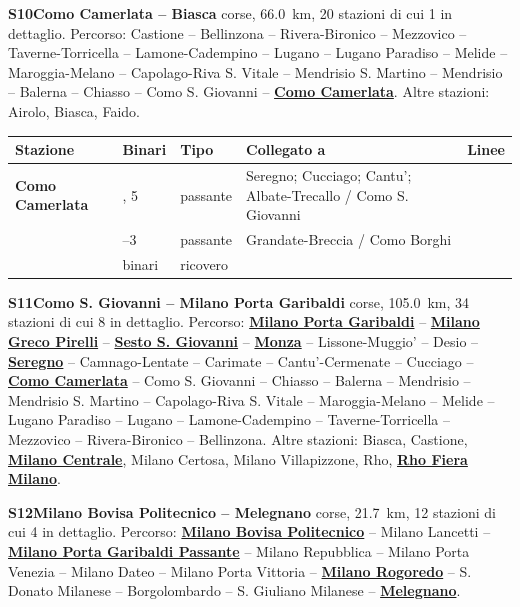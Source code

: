 \medskip\noindent\hypertarget{lin:S10}{\textbf{S10\enspace Como Camerlata -- Biasca}} corse, \SI{66,0}{\km}, 20 stazioni di cui 1 in dettaglio. Percorso: Castione -- Bellinzona -- Rivera-Bironico -- Mezzovico -- Taverne-Torricella -- Lamone-Cadempino -- Lugano -- Lugano Paradiso -- Melide -- Maroggia-Melano -- Capolago-Riva S. Vitale -- Mendrisio S. Martino -- Mendrisio -- Balerna -- Chiasso -- Como S. Giovanni -- \hyperlink{sta:S09998}{\textbf{Como Camerlata}}. Altre stazioni: Airolo, Biasca, Faido.
{\footnotesize\setlength{\LTpre}{2pt}\setlength{\LTpost}{0pt}
\begin{longtable}{@{}>{\raggedright\arraybackslash}p{}>{\raggedright\arraybackslash}p{}>{\raggedright\arraybackslash}p{}>{\raggedright\arraybackslash}p{}>{\raggedright\arraybackslash}p{}@{}}
\toprule
Stazione & Binari & Tipo & Collegato a & Linee \\
\midrule
\endhead
\leavevmode\hypertarget{sta:S09998}{}\textbf{Como Camerlata} & 4, 5 & passante & Seregno; Cucciago; Cantu'; Albate-Trecallo / Como S. Giovanni &  \\
 & 1--3 & passante & Grandate-Breccia / Como Borghi &  \\
 & 2 binari & ricovero & & \\
\bottomrule
\end{longtable}}

\medskip\noindent\hypertarget{lin:S11}{\textbf{S11\enspace Como S. Giovanni -- Milano Porta Garibaldi}} corse, \SI{105,0}{\km}, 34 stazioni di cui 8 in dettaglio. Percorso: \hyperlink{sta:S01645}{\textbf{Milano Porta Garibaldi}} -- \hyperlink{sta:S01326}{\textbf{Milano Greco Pirelli}} -- \hyperlink{sta:S01325}{\textbf{Sesto S. Giovanni}} -- \hyperlink{sta:S01322}{\textbf{Monza}} -- Lissone-Muggio' -- Desio -- \hyperlink{sta:S01318}{\textbf{Seregno}} -- Camnago-Lentate -- Carimate -- Cantu'-Cermenate -- Cucciago -- \hyperlink{sta:S09998}{\textbf{Como Camerlata}} -- Como S. Giovanni -- Chiasso -- Balerna -- Mendrisio -- Mendrisio S. Martino -- Capolago-Riva S. Vitale -- Maroggia-Melano -- Melide -- Lugano Paradiso -- Lugano -- Lamone-Cadempino -- Taverne-Torricella -- Mezzovico -- Rivera-Bironico -- Bellinzona. Altre stazioni: Biasca, Castione, \hyperlink{sta:S01700}{\textbf{Milano Centrale}}, Milano Certosa, Milano Villapizzone, Rho, \hyperlink{sta:S01039}{\textbf{Rho Fiera Milano}}.

\medskip\noindent\hypertarget{lin:S12}{\textbf{S12\enspace Milano Bovisa Politecnico -- Melegnano}} corse, \SI{21,7}{\km}, 12 stazioni di cui 4 in dettaglio. Percorso: \hyperlink{sta:S01642}{\textbf{Milano Bovisa Politecnico}} -- Milano Lancetti -- \hyperlink{sta:S01647}{\textbf{Milano Porta Garibaldi Passante}} -- Milano Repubblica -- Milano Porta Venezia -- Milano Dateo -- Milano Porta Vittoria -- \hyperlink{sta:S01820}{\textbf{Milano Rogoredo}} -- S. Donato Milanese -- Borgolombardo -- S. Giuliano Milanese -- \hyperlink{sta:S01822}{\textbf{Melegnano}}.

